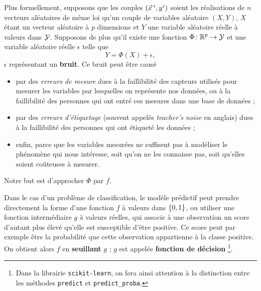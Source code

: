 Plus formellement, supposons que les couples $(\xx^i, y^i)$ soient les
réalisations de $n$ vecteurs aléatoires de même loi qu'un couple de variables
aléatoire $(X, Y)$, $X$ étant un vecteur aléatoire à $p$ dimensions et $Y$ une
variable aléatoire réelle à valeurs dans $\mathcal{Y}$. Supposons de plus qu'il existe
une fonction $\Phi \colon \mathbb{R}^p \to \mathcal{Y}$ et une variable aléatoire réelle
$\epsilon$ telle que
  \begin{equation}
  Y = \Phi(X) + \epsilon,
  \label{eq:probabilistic_ml}
\end{equation}
$\epsilon$ représentant un \textbf{bruit}.
Ce bruit peut être causé
\begin{itemize}
\item par des {\it erreurs de mesure} dues à la faillibilité des capteurs
  utilisés pour mesurer les variables par lesquelles on représente nos
  données, ou à la faillibilité des personnes qui ont entré ces
  mesures dans une base de données ;
\item par des {\it erreurs d'étiquetage} (souvent appelés {\it teacher's noise}
  en anglais) dues à la faillibilité des personnes qui ont étiqueté
  les données ;
\item enfin, parce que les variables mesurées ne suffisent pas à modéliser le
  phénomène qui nous intéresse, soit qu'on ne les connaisse pas, soit
  qu'elles soient coûteuses à mesurer.
\end{itemize}
Notre but est d'approcher $\Phi$ par $f$.

Dans le cas d'un problème de classification, le modèle prédictif peut prendre
directement la forme d'une fonction $f$ à valeurs dans $\lbrace 0, 1 \rbrace$, ou utiliser
une fonction intermédiaire $g$ à valeurs réelles, qui associe à une observation
un score d'autant plus élevé qu'elle est susceptible d'être positive. Ce score
peut par exemple être la probabilité que cette observation appartienne à la
classe positive. On obtient alors $f$ en \textbf{seuillant} $g$ ; $g$ est
appelée \textbf{fonction de décision} \footnote{Dans la librairie
  \texttt{scikit-learn}, on fera ainsi attention à la distinction entre les
  méthodes \texttt{predict} et \texttt{predict\_proba}.}.

